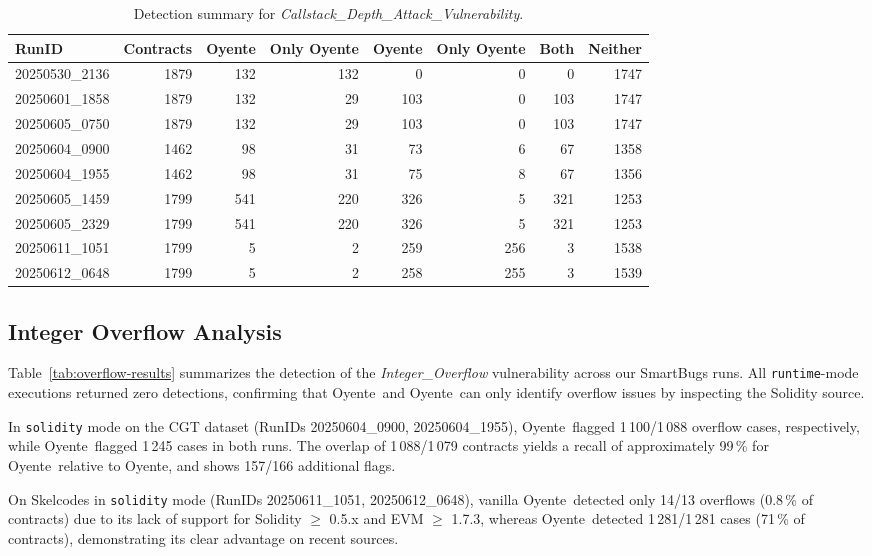 \documentclass{article}
\newcommand\OY{Oyente}
\newcommand\OYp{\OY\raisebox{0.3ex}{\smaller +}}
\newcommand\CGTrbcA{20250530\_2136}%
\newcommand\CGTrbcB{20250601\_1858}%
\newcommand\CGTrbcC{20250605\_0750}%
\newcommand\CGTsscA{20250604\_0900}%
\newcommand\CGTsscB{20250604\_1955}%
\newcommand\SKCrbcA{20250605\_1459}%
\newcommand\SKCrbcB{20250605\_2329}%
\newcommand\SKCsscA{20250611\_1051}%
\newcommand\SKCsscB{20250612\_0648}%
\begin{document}
    \setlength\tabcolsep{4.5pt}

	\begin{table}[ht]
        \centering
        \setlength\tabcolsep{4.5pt}%
		\begin{tabular}{lrrrrrrr}
			\toprule
			\textbf{RunID} & \textbf{Contracts} & \textbf{\OY} & \textbf{Only \OY} & \textbf{\OYp} & \textbf{Only \OYp} & \textbf{Both} & \textbf{Neither} \\
			\midrule
			\CGTrbcA & 1879 & 132 & 132 & 0 & 0 & 0 & 1747 \\
			\CGTrbcB & 1879 & 132 & 29 & 103 & 0 & 103 & 1747 \\
			\CGTrbcC & 1879 & 132 & 29 & 103 & 0 & 103 & 1747 \\
			\CGTsscA & 1462 & 98 & 31 & 73 & 6 & 67 & 1358 \\
			\CGTsscB & 1462 & 98 & 31 & 75 & 8 & 67 & 1356 \\
			\SKCrbcA & 1799 & 541 & 220 & 326 & 5 & 321 & 1253 \\
			\SKCrbcB & 1799 & 541 & 220 & 326 & 5 & 321 & 1253 \\
			\SKCsscA & 1799 & 5 & 2 & 259 & 256 & 3 & 1538 \\
			\SKCsscB & 1799 & 5 & 2 & 258 & 255 & 3 & 1539 \\
			\bottomrule
		\end{tabular}
		\caption{Detection summary for \emph{Callstack\_Depth\_Attack\_Vulnerability}.}
		\label{tab:callstack-results}
	\end{table}

	\subsection{Integer Overflow Analysis}
	Table~\ref{tab:overflow-results} summarizes the detection of the \emph{Integer\_Overflow} vulnerability across our SmartBugs runs. All \texttt{runtime}-mode executions returned zero detections, confirming that \OY\ and \OYp\ can only identify overflow issues by inspecting the Solidity source.

	In \texttt{solidity} mode on the CGT dataset (RunIDs \CGTsscA, \CGTsscB), \OY\ flagged 1\,100/1\,088 overflow cases, respectively, while \OYp\ flagged 1\,245 cases in both runs. The overlap of 1\,088/1\,079 contracts yields a recall of approximately 99\,\% for \OYp\ relative to \OY, and shows 157/166 additional flags.

	On Skelcodes in \texttt{solidity} mode (RunIDs \SKCsscA, \SKCsscB), vanilla \OY\ detected only 14/13 overflows (0.8\,\% of contracts) due to its lack of support for Solidity $\ge$ 0.5.x and EVM $\ge$ 1.7.3, whereas \OYp\ detected 1\,281/1\,281 cases (71\,\% of contracts), demonstrating its clear advantage on recent sources.
\end{document}

